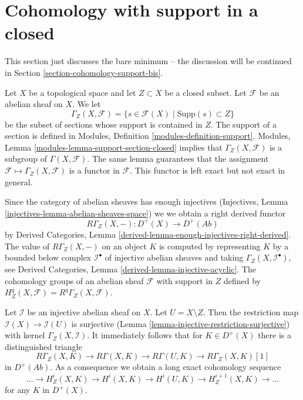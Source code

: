 \section{Cohomology with support in a closed}
\label{section-cohomology-support}

\noindent
This section just discusses the bare minimum -- the discussion
will be continued in Section \ref{section-cohomology-support-bis}.

\medskip\noindent
Let $X$ be a topological space and let $Z \subset X$ be a closed subset.
Let $\mathcal{F}$ be an abelian sheaf on $X$. We let
$$
\Gamma_Z(X, \mathcal{F}) =
\{s \in \mathcal{F}(X) \mid \text{Supp}(s) \subset Z\}
$$
be the subset of sections whose support is contained in $Z$.
The support of a section is defined in
Modules, Definition \ref{modules-definition-support}.
Modules, Lemma \ref{modules-lemma-support-section-closed}
implies that $\Gamma_Z(X, \mathcal{F})$ is a subgroup of
$\Gamma(X, \mathcal{F})$. The same lemma guarantees that
the assignment $\mathcal{F} \mapsto \Gamma_Z(X, \mathcal{F})$
is a functor in $\mathcal{F}$.
This functor is left exact but not exact in general.

\medskip\noindent
Since the category of abelian sheaves has enough injectives
(Injectives, Lemma \ref{injectives-lemma-abelian-sheaves-space})
we we obtain a right derived functor
$$
R\Gamma_Z(X, -) : D^+(X) \longrightarrow D^+(\textit{Ab})
$$
by
Derived Categories, Lemma \ref{derived-lemma-enough-injectives-right-derived}.
The value of $R\Gamma_Z(X, -)$ on an object $K$ is computed by representing
$K$ by a bounded below complex $\mathcal{I}^\bullet$ of injective abelian
sheaves and taking $\Gamma_Z(X, \mathcal{I}^\bullet)$, see
Derived Categories, Lemma \ref{derived-lemma-injective-acyclic}.
The cohomology groups of an abelian sheaf $\mathcal{F}$
with support in $Z$ defined by
$H^q_Z(X, \mathcal{F}) = R^q\Gamma_Z(X, \mathcal{F})$.

\medskip\noindent
Let $\mathcal{I}$ be an injective abelian sheaf on $X$. Let
$U = X \setminus Z$. Then the restriction map
$\mathcal{I}(X) \to \mathcal{I}(U)$ is surjective
(Lemma \ref{lemma-injective-restriction-surjective})
with kernel $\Gamma_Z(X, \mathcal{I})$. It immediately follows that
for $K \in D^+(X)$ there is a distinguished triangle
$$
R\Gamma_Z(X, K) \to R\Gamma(X, K) \to R\Gamma(U, K) \to R\Gamma_Z(X, K)[1]
$$
in $D^+(\textit{Ab})$. As a consequence we obtain a long exact cohomology
sequence
$$
\ldots \to H^i_Z(X, K) \to H^i(X, K) \to H^i(U, K) \to
H^{i + 1}_Z(X, K) \to \ldots
$$
for any $K$ in $D^+(X)$.

